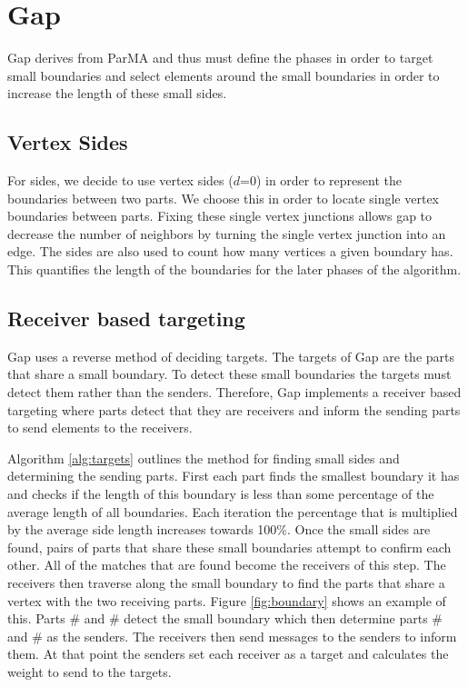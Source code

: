 \documentclass{thesis}
\begin{document}
  
\section{Gap}

Gap derives from ParMA and thus must define the phases in order to target 
small boundaries and select elements around the small boundaries in order 
to increase the length of these small sides. 

\subsection{Vertex Sides}

For sides, we decide to use vertex sides ($d$=0) in order to represent the 
boundaries between two parts. We choose this in order to locate single vertex 
boundaries between parts. Fixing these single vertex junctions allows gap to 
decrease the number of neighbors by turning the single vertex junction into 
an edge. The sides are also used to count how many vertices a given boundary 
has. This quantifies the length of the boundaries for the later phases of the 
algorithm.

\subsection{Receiver based targeting}

Gap uses a reverse method of deciding targets. The targets of Gap are the 
parts that share a small boundary. To detect these small boundaries the 
targets must detect them rather than the senders. Therefore, Gap implements 
a receiver based targeting where parts detect that they are receivers and 
inform the sending parts to send elements to the receivers. 

Algorithm \ref{alg:targets} outlines the method for finding small sides 
and determining the sending parts. First each part finds the smallest 
boundary it has and checks if the length of this boundary is less than 
some percentage of the average length of all boundaries. Each iteration 
the percentage that is multiplied by the average side length increases 
towards 100\%. Once the small sides are found, pairs of parts that share 
these small boundaries attempt to confirm each other. All of the matches 
that are found become the receivers of this step. The receivers then 
traverse along the small boundary to find the parts that share a vertex 
with the two receiving parts. Figure \ref{fig:boundary} shows an example 
of this. Parts \# and \# detect the small boundary which then determine 
parts \# and \# as the senders. The receivers then send messages to the 
senders to inform them. At that point the senders set each receiver as a 
target and calculates the weight to send to the targets.
\end{document}

